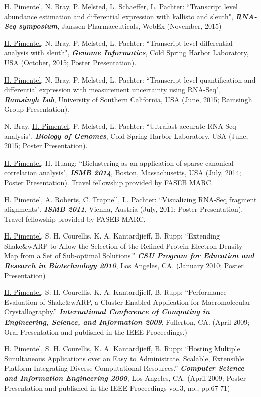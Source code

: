 \documentclass[margin,line]{res}
\begin{document}
\begin{resume}
\underline{H. Pimentel}, N. Bray, P. Melsted, L. Schaeffer, L. Pachter: ``Transcript level abundance estimation and differential expression with kallisto and sleuth", {\bf \emph{RNA-Seq symposium}}, Janssen Pharmaceuticals, WebEx (November, 2015)

\underline{H. Pimentel}, N. Bray, P. Melsted, L. Pachter: ``Transcript level differential analysis with sleuth", {\bf \emph{Genome Informatics}}, Cold Spring Harbor
Laboratory, USA (October, 2015; Poster Presentation).

\underline{H. Pimentel}, N. Bray, P. Melsted, L. Pachter: ``Transcript-level
quantification and differential expression with measurement uncertainty using
RNA-Seq", {\bf \emph{Ramsingh Lab}}, University of Southern California, USA (June,
2015; Ramsingh Group Presentation).

N. Bray, \underline{H. Pimentel}, P. Melsted, L. Pachter: ``Ultrafast accurate
RNA-Seq analysis", {\bf \emph{Biology of Genomes}}, Cold Spring Harbor
Laboratory, USA (June, 2015; Poster Presentation).

\underline{H. Pimentel}, H. Huang: ``Biclustering as an application of sparse
canonical correlation analysis", {\bf \emph{ISMB 2014}}, Boston, Massachusetts,
USA (July, 2014; Poster Presentation). Travel fellowship provided by FASEB
MARC.

\underline{H. Pimentel}, A. Roberts, C. Trapnell, L. Pachter: ``Visualizing
RNA-Seq fragment alignments", {\bf \emph{ISMB 2011}}, Vienna, Austria (July,
2011; Poster Presentation). Travel fellowship provided by FASEB MARC.

\underline{H. Pimentel}, S. H. Courellis, K. A. Kantardjieff, B. Rupp:
``Extending Shake\&wARP to Allow the Selection of the Refined Protein Electron
Density Map from a Set of Sub-optimal Solutions.'' {\bf \emph{CSU Program for
    Education and Research in Biotechnology 2010}}, Los Angeles, CA. (January
2010; Poster Presentation)

\underline{H. Pimentel}, S. H. Courellis, K. A. Kantardjieff, B. Rupp:
``Performance Evaluation of Shake\&wARP, a Cluster Enabled Application for
Macromolecular Crystallography.'' {\bf \emph{International Conference of
    Computing in Engineering, Science, and Information
    2009}}, Fullerton, CA. (April 2009; Oral Presentation and published in the
         IEEE Proceedings.)

\underline{H. Pimentel}, S. H. Courellis, K. A. Kantardjieff, B. Rupp:
``Hosting Multiple Simultaneous Applications over an Easy to
Administrate, Scalable, Extensible Platform Integrating Diverse
Computational Resources.'' {\bf \emph{Computer Science and Information
    Engineering 2009}}, Los Angeles,
CA. (April 2009; Poster Presentation and published in the
IEEE Proceedings vol.3, no., pp.67-71)


\end{resume}
\end{document}
